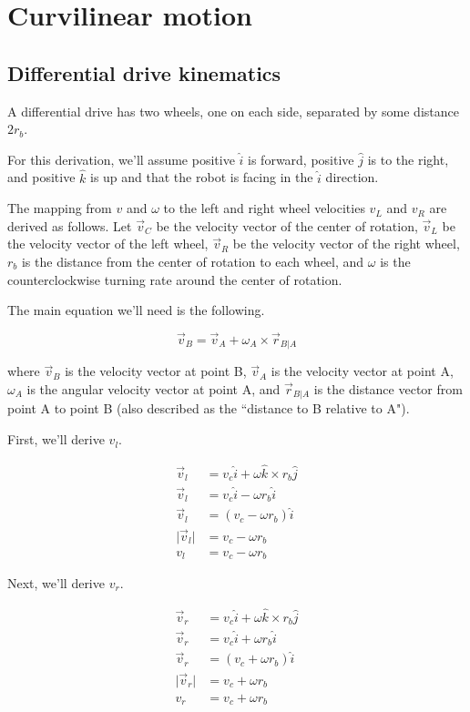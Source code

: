 \section{Curvilinear motion}

\subsection{Differential drive kinematics}

A differential drive has two wheels, one on each side, separated by some
distance $2r_b$.

For this derivation, we'll assume positive $\hat{i}$ is forward, positive
$\hat{j}$ is to the right, and positive $\hat{k}$ is up and that the robot is
facing in the $\hat{i}$ direction.

The mapping from $v$ and $\omega$ to the left and right wheel velocities $v_L$
and $v_R$ are derived as follows. Let $\vec{v}_C$ be the velocity vector of the
center of rotation, $\vec{v}_L$ be the velocity vector of the left wheel,
$\vec{v}_R$ be the velocity vector of the right wheel, $r_b$ is the distance
from the center of rotation to each wheel, and $\omega$ is the counterclockwise
turning rate around the center of rotation.

The main equation we'll need is the following.

\begin{equation*}
  \vec{v}_B = \vec{v}_A + \omega_A \times \vec{r}_{B|A}
\end{equation*}

where $\vec{v}_B$ is the velocity vector at point B, $\vec{v}_A$ is the velocity
vector at point A, $\omega_A$ is the angular velocity vector at point A, and
$\vec{r}_{B|A}$ is the distance vector from point A to point B (also described
as the ``distance to B relative to A").

First, we'll derive $v_l$.

\begin{align}
  \vec{v}_l &= v_c \hat{i} + \omega \hat{k} \times r_b \hat{j} \nonumber \\
  \vec{v}_l &= v_c \hat{i} - \omega r_b \hat{i} \nonumber \\
  \vec{v}_l &= (v_c - \omega r_b) \hat{i} \nonumber \\
  \lvert\vec{v}_l\rvert &= v_c - \omega r_b \nonumber \\
  v_l &= v_c - \omega r_b \label{eq:diff_vl}
\end{align}

Next, we'll derive $v_r$.

\begin{align}
  \vec{v}_r &= v_c \hat{i} + \omega \hat{k} \times r_b \hat{j} \nonumber
    \\
  \vec{v}_r &= v_c \hat{i} + \omega r_b \hat{i} \nonumber \\
  \vec{v}_r &= (v_c + \omega r_b) \hat{i} \nonumber \\
  \lvert\vec{v}_r\rvert &= v_c + \omega r_b \nonumber \\
  v_r &= v_c + \omega r_b \label{eq:diff_vr}
\end{align}
